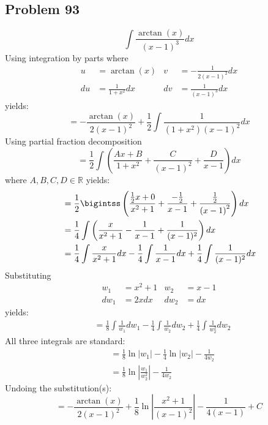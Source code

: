 \documentclass{article}
\begin{document}
\subsection*{Problem 93}
$$\int\frac{\arctan\left(x\right)}{\left(x-1\right)^3}dx$$
Using integration by parts where
\begin{align*}
u&=\arctan(x) &v&=-\frac{1}{2(x-1)^2}dx \\
du&=\frac{1}{1+x^2}dx &dv&=\frac{1}{(x-1)^3}dx
\end{align*}
yields:
$$=-\frac{\arctan(x)}{2(x-1)^2}+\frac{1}{2}\int\frac{1}{(1+x^2)(x-1)^2}dx$$
Using partial fraction decomposition
$$=\frac{1}{2}\int\left(\frac{Ax+B}{1+x^2}+\frac{C}{(x-1)^2}+\frac{D}{x-1}\right)dx$$
where $A,B,C,D\in\mathbb{R}$ yields:
\begin{align*}
&=\frac{1}{2}\bigintss\left(\frac{\frac{1}{2}x+0}{x^2+1}+\frac{-\frac{1}{2}}{x-1}+\frac{\frac{1}{2}}{\left(x-1\right)^2}\right)dx \\
&=\frac{1}{4}\int\left(\frac{x}{x^2+1}-\frac{1}{x-1}+\frac{1}{(x-1)^2}\right)dx \\
&=\frac{1}{4}\int\frac{x}{x^2+1}dx-\frac{1}{4}\int\frac{1}{x-1}dx+\frac{1}{4}\int\frac{1}{(x-1)^2}dx
\end{align*}
Substituting
\begin{align*}
w_1&=x^2+1 &w_2&=x-1 \\
dw_1&=2xdx &dw_2&=dx
\end{align*}
yields:
\begin{align*}
&=\frac{1}{8}\int\frac{1}{w_1}dw_1-\frac{1}{4}\int\frac{1}{w_2}dw_2+\frac{1}{4}\int\frac{1}{w_2^2}dw_2
\end{align*}
All three integrals are standard:
\begin{align*}
&=\frac{1}{8}\ln\left|w_1\right|-\frac{1}{4}\ln\left|w_2\right|-\frac{1}{4w_2} \\
&=\frac{1}{8}\ln\left|\frac{w_1}{w_2^2}\right|-\frac{1}{4w_2}
\end{align*}
Undoing the substitution(s):
$$=-\frac{\arctan(x)}{2(x-1)^2}+\frac{1}{8}\ln\left|\frac{x^2+1}{(x-1)^2}\right|-\frac{1}{4(x-1)}+C$$
\end{document}
